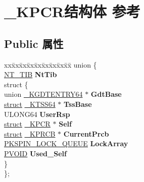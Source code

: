 \hypertarget{struct___k_p_c_r}{}\section{\+\_\+\+K\+P\+C\+R结构体 参考}
\label{struct___k_p_c_r}
\subsection*{Public 属性}
\begin{DoxyCompactItemize}
\item 
\mbox{\label{struct___k_p_c_r_afa0128dcea5e68b4ee8c645b97ea5530}} 
\begin{tabbing}
xx\=xx\=xx\=xx\=xx\=xx\=xx\=xx\=xx\=\kill
union \{\\
\>\hyperlink{struct___n_t___t_i_b}{NT\_TIB} {\bfseries NtTib}\\
\mbox{\label{union___k_p_c_r_1_1_0D3203_acde930960fca332bc0efa4508011dcdf}} 
\>struct \{\\
\>\>union \hyperlink{union___k_g_d_t_e_n_t_r_y64}{\_KGDTENTRY64} $\ast$ {\bfseries GdtBase}\\
\>\>\hyperlink{interfacestruct}{struct} \hyperlink{struct___k_t_s_s64}{\_KTSS64} $\ast$ {\bfseries TssBase}\\
\>\>ULONG64 {\bfseries UserRsp}\\
\>\>\hyperlink{interfacestruct}{struct} \hyperlink{struct___k_p_c_r}{\_KPCR} $\ast$ {\bfseries Self}\\
\>\>\hyperlink{interfacestruct}{struct} \hyperlink{struct___k_p_r_c_b}{\_KPRCB} $\ast$ {\bfseries CurrentPrcb}\\
\>\>\hyperlink{struct___k_s_p_i_n___l_o_c_k___q_u_e_u_e}{PKSPIN\_LOCK\_QUEUE} {\bfseries LockArray}\\
\>\>\hyperlink{interfacevoid}{PVOID} {\bfseries Used\_Self}\\
\>\} \\
\}; \\


\end{tabbing}
\end{DoxyCompactItemize}

